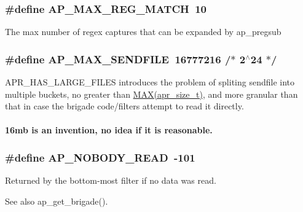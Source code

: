 \subsubsection[{\texorpdfstring{A\+P\+\_\+\+M\+A\+X\+\_\+\+R\+E\+G\+\_\+\+M\+A\+T\+CH}{AP_MAX_REG_MATCH}}]{\setlength{\rightskip}{0pt plus 5cm}\#define A\+P\+\_\+\+M\+A\+X\+\_\+\+R\+E\+G\+\_\+\+M\+A\+T\+CH~10}\hypertarget{group__APACHE__CORE__DAEMON_ga7cc324c99d14a68ba7c8d1aae306a8d8}{}\label{group__APACHE__CORE__DAEMON_ga7cc324c99d14a68ba7c8d1aae306a8d8}
The max number of regex captures that can be expanded by ap\+\_\+pregsub 
\subsubsection[{\texorpdfstring{A\+P\+\_\+\+M\+A\+X\+\_\+\+S\+E\+N\+D\+F\+I\+LE}{AP_MAX_SENDFILE}}]{\setlength{\rightskip}{0pt plus 5cm}\#define A\+P\+\_\+\+M\+A\+X\+\_\+\+S\+E\+N\+D\+F\+I\+LE~16777216  /$\ast$ 2$^\wedge$24 $\ast$/}\hypertarget{group__APACHE__CORE__DAEMON_ga9eac925b49a5ba9d68f29b6c93e3e1e5}{}\label{group__APACHE__CORE__DAEMON_ga9eac925b49a5ba9d68f29b6c93e3e1e5}
A\+P\+R\+\_\+\+H\+A\+S\+\_\+\+L\+A\+R\+G\+E\+\_\+\+F\+I\+L\+ES introduces the problem of spliting sendfile into multiple buckets, no greater than \hyperlink{mod__proxy_8c_aacc3ee1a7f283f8ef65cea31f4436a95}{M\+A\+X(apr\+\_\+size\+\_\+t)}, and more granular than that in case the brigade code/filters attempt to read it directly. \paragraph*{16mb is an invention, no idea if it is reasonable.}
\subsubsection[{\texorpdfstring{A\+P\+\_\+\+N\+O\+B\+O\+D\+Y\+\_\+\+R\+E\+AD}{AP_NOBODY_READ}}]{\setlength{\rightskip}{0pt plus 5cm}\#define A\+P\+\_\+\+N\+O\+B\+O\+D\+Y\+\_\+\+R\+E\+AD~-\/101}\hypertarget{group__APACHE__CORE__DAEMON_gafafcc328b1e4659b888a331e302c7d43}{}\label{group__APACHE__CORE__DAEMON_gafafcc328b1e4659b888a331e302c7d43}
Returned by the bottom-\/most filter if no data was read. \begin{DoxySeeAlso}{See also}
ap\+\_\+get\+\_\+brigade(). 
\end{DoxySeeAlso}
